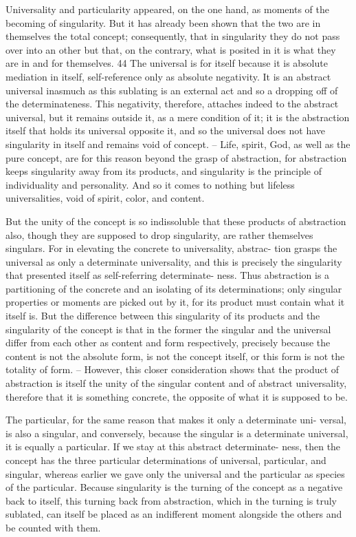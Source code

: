 Universality and particularity appeared, on the one hand, as moments of
the becoming of singularity. But it has already been shown that the two are
in themselves the total concept; consequently, that in singularity they do
not pass over into an other but that, on the contrary, what is posited in it is
what they are in and for themselves. 44 The universal is for itself because it
is absolute mediation in itself, self-reference only as absolute negativity. It
is an abstract universal inasmuch as this sublating is an external act and so
a dropping off of the determinateness. This negativity, therefore, attaches
indeed to the abstract universal, but it remains outside it, as a mere condition
of it; it is the abstraction itself that holds its universal opposite it, and so the
universal does not have singularity in itself and remains void of concept. –
Life, spirit, God, as well as the pure concept, are for this reason beyond
the grasp of abstraction, for abstraction keeps singularity away from its
products, and singularity is the principle of individuality and personality.
And so it comes to nothing but lifeless universalities, void of spirit, color,
and content.

But the unity of the concept is so indissoluble that these products of
abstraction also, though they are supposed to drop singularity, are rather
themselves singulars. For in elevating the concrete to universality, abstrac-
tion grasps the universal as only a determinate universality, and this is
precisely the singularity that presented itself as self-referring determinate-
ness. Thus abstraction is a partitioning of the concrete and an isolating of its
determinations; only singular properties or moments are picked out by it,
for its product must contain what it itself is. But the difference between this
singularity of its products and the singularity of the concept is that in the
former the singular and the universal differ from each other as content and
form respectively, precisely because the content is not the absolute form, is
not the concept itself, or this form is not the totality of form. – However,
this closer consideration shows that the product of abstraction is itself the
unity of the singular content and of abstract universality, therefore that it
is something concrete, the opposite of what it is supposed to be.

The particular, for the same reason that makes it only a determinate uni-
versal, is also a singular, and conversely, because the singular is a determinate
universal, it is equally a particular. If we stay at this abstract determinate-
ness, then the concept has the three particular determinations of universal,
particular, and singular, whereas earlier we gave only the universal and the
particular as species of the particular. Because singularity is the turning of
the concept as a negative back to itself, this turning back from abstraction,
which in the turning is truly sublated, can itself be placed as an indifferent
moment alongside the others and be counted with them.

